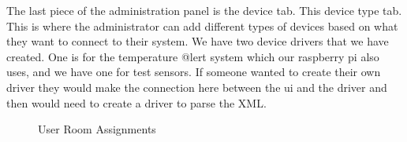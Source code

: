 \documentclass{report}
\begin{document}
\indent 
The last piece of the administration panel is the device tab. This device type tab. This is where the administrator can add different types of devices based on what they want to connect to their system. We have two device drivers that we have created. One is for the temperature @lert system which our raspberry pi also uses, and we have one for test sensors. If someone wanted to create their own driver they would make the connection here between the ui and the driver and then would need to create a driver to parse the XML.
\begin{figure}[H]
	\caption{User Room Assignments}
\end{figure}
\newpage
\end{document}
